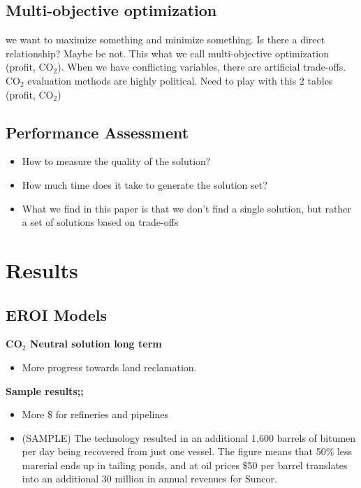 \documentclass[12pt]{article}
\begin{document}
\subsection{Multi-objective optimization}
we want to maximize something and minimize something. Is there a direct relationship?
Maybe be not. This what we call multi-objective optimization (profit, CO$_2$). When we have conflicting variables, there are artificial trade-offs.  \\

CO$_2$ evaluation methods are highly political. Need to play with this 2 tables (profit, CO$_2$)

\subsection{Performance Assessment}
\begin{itemize}
\item How to measure the quality of the solution? 
\item How much time does it take to generate the solution set?
\item What we find in this paper is that we don't find a single solution, but rather a set of solutions based on trade-offs
\end{itemize}


\section{Results}
\subsection{EROI Models}

{\bf CO$_2$ Neutral solution long term}
\begin{itemize}
\item More progress towards land reclamation. 
\end{itemize}


{\bf Sample results;;}
\begin{itemize}
\item More \$ for refineries and pipelines
\item (SAMPLE) The technology resulted in an additional 1,600 barrels of bitumen per day being recovered from just one vessel. The figure means that 50\% less marerial ends up in tailing ponds, and at oil prices \$50 per barrel translates into an additional 30 million in annual revenues for Suncor. 
\end{itemize}
\end{document}
